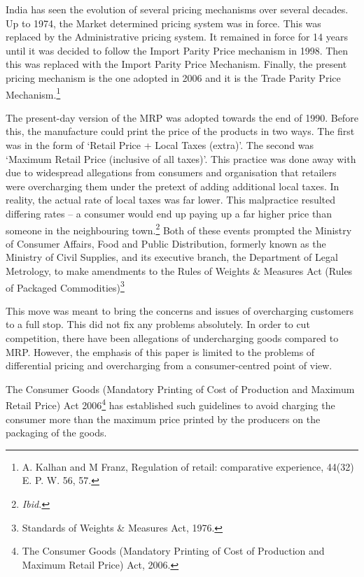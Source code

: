 \begin{multicols}{2}
\vspace{-.1cm}

\noi
India has seen the evolution of several pricing mechanisms over several decades. Up to 1974,
the Market determined pricing system was in force. This was replaced by the Administrative
pricing system. It remained in force for 14 years until it was decided to follow the Import Parity
Price mechanism in 1998. Then this was replaced with the Import Parity Price Mechanism.
Finally, the present pricing mechanism is the one adopted in 2006 and it is the Trade Parity
Price Mechanism.\footnote{A. Kalhan and M Franz, Regulation of retail: comparative experience, 44(32) E. P. W. 56, 57.}

\vspace{-.1cm}

\noi
The present-day version of the MRP was adopted towards the end of 1990. Before this, the
manufacture could print the price of the products in two ways. The first was in the form of
‘Retail Price + Local Taxes (extra)’. The second was ‘Maximum Retail Price (inclusive of all
taxes)’. This practice was done away with due to widespread allegations from consumers and
organisation that retailers were overcharging them under the pretext of adding additional local
taxes. In reality, the actual rate of local taxes was far lower. This malpractice resulted differing
rates – a consumer would end up paying up a far higher price than someone in the neighbouring
town.\footnote{\textit{Ibid.}} Both of these events prompted the Ministry of Consumer Affairs, Food and Public
Distribution, formerly known as the Ministry of Civil Supplies, and its executive branch, the
Department of Legal Metrology, to make amendments to the Rules of Weights \& Measures
Act (Rules of Packaged Commodities)\footnote{Standards of Weights \& Measures Act, 1976.}

\vspace{-.1cm}

\noi
This move was meant to bring the concerns and issues of overcharging customers to a full stop.
This did not fix any problems absolutely. In order to cut competition, there have been allegations of undercharging goods compared to MRP. However, the emphasis of this paper is
limited to the problems of differential pricing and overcharging from a consumer-centred point
of view.

\vspace{-.1cm}

\noi
The Consumer Goods (Mandatory Printing of Cost of Production and Maximum Retail Price)
Act 2006\footnote{The Consumer Goods (Mandatory Printing of Cost of Production and Maximum Retail Price) Act, 2006.} has established such guidelines to avoid charging the consumer more than the
maximum price printed by the producers on the packaging of the goods.


\end{multicols}
